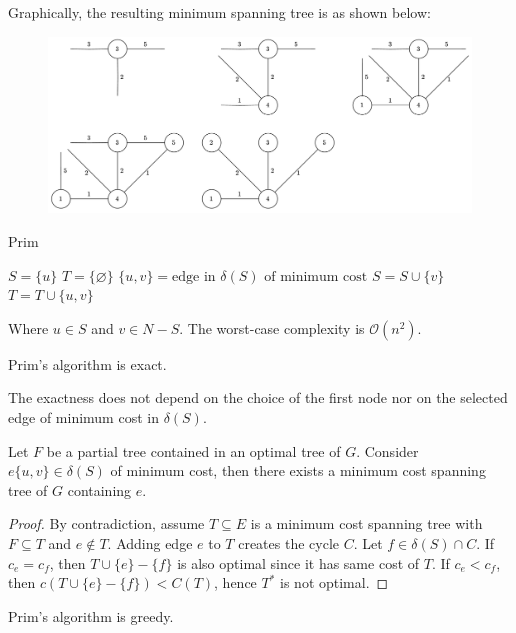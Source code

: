 \begin{example}
    Graphically, the resulting minimum spanning tree is as shown below:
    \begin{figure}[H]
        \centering
        \includegraphics[width=0.8\linewidth]{images/MST.png}
    \end{figure}
\end{example}
\begin{algorithm}[H]
    \caption{Prim}
        \begin{algorithmic}[1]
            \State $S = \{u\}$
            \State $T = \{\varnothing\}$
                \State $\{u,v\}= \text{edge in } \delta(S) \text{ of minimum cost}$
                \State $S = S \cup \{v\}$
                \State $T = T \cup \{u,v\}$
            \EndWhile
        \end{algorithmic}
\end{algorithm}
Where $u \in S$ and $v \in N-S$. 
The worst-case complexity is $\mathcal{O}(n^2)$. 
\newpage
\begin{proposition}
    Prim's algorithm is exact. 
\end{proposition}        
The exactness does not depend on the choice of the first node nor on the selected edge of minimum cost in $\delta(S)$. 
\begin{property}
    Let $F$ be a partial tree contained in an optimal tree of $G$. 
    Consider $e\{u,v\}\in \delta(S)$ of minimum cost, then there exists a minimum cost spanning tree of $G$ containing $e$. 
\end{property}
\begin{proof}
    By contradiction, assume $T \subseteq E$ is a minimum cost spanning tree with $F \subseteq T$ and $e \notin T$. 
    Adding edge $e$ to $T$ creates the cycle $C$. 
    Let $f \in \delta(S) \cap C$.
    If $c_e=c_f$, then $T\cup\{e\}-\{f\}$ is also optimal since it has same cost of $T$.
    If $c_e<c_f$, then $c\left(T\cup\{e\}-\{f\}\right)<C(T)$, hence $T^{\ast}$ is not optimal.
\end{proof}
\begin{proposition}
    Prim's algorithm is greedy. 
\end{proposition}     
